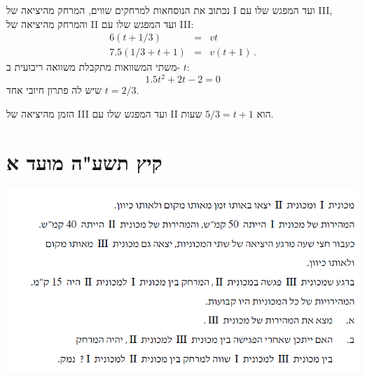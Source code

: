 \documentclass[12pt,a4paper]{article}
\begin{document}
נכתוב את הנוסחאות למרחקים שווים, המרחק מהיציאה של I ועד המפגש שלו עם III, והמרחק מהיציאה של II ועד המפגש שלו עם III:
\begin{eqnarray*}
6(t+1/3) &=& vt\\
7.5(1/3+t+1) &=& v(t+1)\,.
\end{eqnarray*}
משתי המשוואות מתקבלת משוואה ריבועית ב-
$t$:
\[
1.5t^2 + 2t - 2 = 0
\]
שיש לה פתרון חיובי אחד
$t=2/3$.

\smallskip

הזמן מהיציאה של III ועד המפגש שלו עם II הוא
$5/3=t+1$
שעות.


\newpage


\section*{קיץ תשע"ה מועד א}

\begin{center}
\includegraphics[width=.8\textwidth]{summer-2015a-1}
\end{center}
\end{document}
